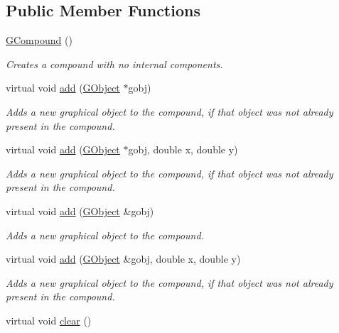 \subsection*{Public Member Functions}
\begin{DoxyCompactItemize}
\item 
\mbox{\hyperlink{classsgl_1_1GCompound_a96d2773de31d81df96135d8621cf47df}{G\+Compound}} ()
\begin{DoxyCompactList}\small\item\em Creates a compound with no internal components. \end{DoxyCompactList}\item 
virtual void \mbox{\hyperlink{classsgl_1_1GCompound_afe8277e7b2627513c6f7452fb0b2847d}{add}} (\mbox{\hyperlink{classsgl_1_1GObject}{G\+Object}} $\ast$gobj)
\begin{DoxyCompactList}\small\item\em Adds a new graphical object to the compound, if that object was not already present in the compound. \end{DoxyCompactList}\item 
virtual void \mbox{\hyperlink{classsgl_1_1GCompound_a8bb36f245efc7806414a1339c2befa1c}{add}} (\mbox{\hyperlink{classsgl_1_1GObject}{G\+Object}} $\ast$gobj, double x, double y)
\begin{DoxyCompactList}\small\item\em Adds a new graphical object to the compound, if that object was not already present in the compound. \end{DoxyCompactList}\item 
virtual void \mbox{\hyperlink{classsgl_1_1GCompound_ac732fc2123d7a6d7e2de145fe9bbd8e8}{add}} (\mbox{\hyperlink{classsgl_1_1GObject}{G\+Object}} \&gobj)
\begin{DoxyCompactList}\small\item\em Adds a new graphical object to the compound. \end{DoxyCompactList}\item 
virtual void \mbox{\hyperlink{classsgl_1_1GCompound_a5b11b532869632a6c26b098b0858eac5}{add}} (\mbox{\hyperlink{classsgl_1_1GObject}{G\+Object}} \&gobj, double x, double y)
\begin{DoxyCompactList}\small\item\em Adds a new graphical object to the compound, if that object was not already present in the compound. \end{DoxyCompactList}\item 
virtual void \mbox{\hyperlink{classsgl_1_1GCompound_ac8bb3912a3ce86b15842e79d0b421204}{clear}} ()

\end{DoxyCompactItemize}
